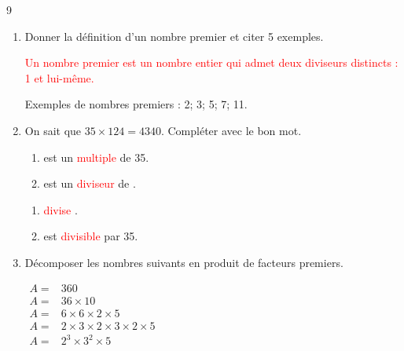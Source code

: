 \documentclass[a4paper]{book}
\begin{document}
{    \begin{exerciceNote}{9}
        \begin{enumerate}[leftmargin=*]
            \item Donner la définition d'un nombre premier et citer 5 exemples.

            \textcolor{red}{Un nombre premier est un nombre entier qui admet deux diviseurs distincts : 1 et lui-même.}

            Exemples de nombres premiers : 2; 3; 5; 7; 11.

            \item On sait que $35\times124=4340$.
            Compléter avec le bon mot.

            \medskip
            
            \begin{minipage}{0.45\linewidth}                
                \begin{enumerate}
                    \item {} est un \textcolor{red}{multiple} de 35.

                    \medskip
                    
                    \item {} est un \textcolor{red}{diviseur} de .
                \end{enumerate}
            \end{minipage}
            \hfill\vline\hfill
            \begin{minipage}{0.45\linewidth}
                \begin{enumerate}
                    \item {}  \textcolor{red}{divise} .

                    \medskip
                    
                    \item {} est \textcolor{red}{divisible} par 35.
                \end{enumerate}
            
            \end{minipage}

            \medskip

            \item Décomposer les nombres suivants en produit de facteurs premiers.

            \begin{minipage}{0.30\linewidth}
                $\begin{array}{ll}
                    A = & 360 \\[1ex]
                    A = & 36\times10\\[1ex]
                    A = & 6\times6\times2\times5\\[1ex]
                    A = & 2\times3\times2\times3\times2\times5\\[1ex]
                    A = & 2^3\times3^2\times5
                \end{array}$
    

\end{minipage}
\end{enumerate}
\end{exerciceNote}}
\end{document}

